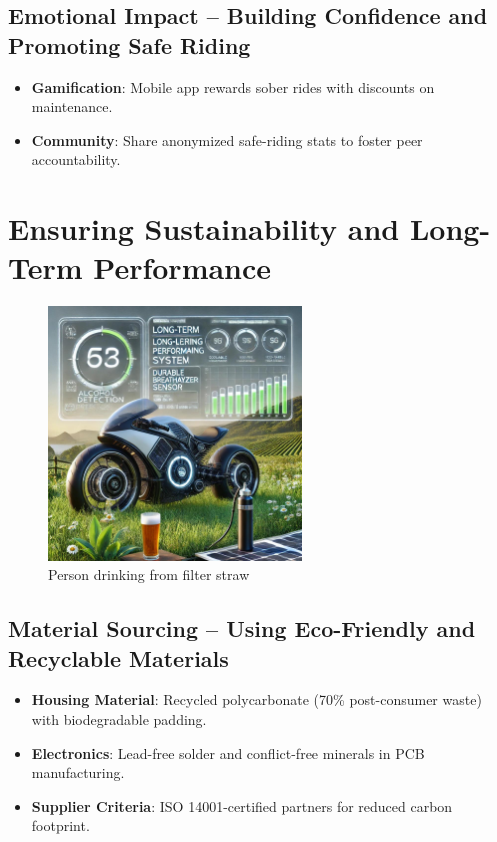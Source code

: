 \documentclass{article}
\begin{document}
\subsection{Emotional Impact -- Building Confidence and Promoting Safe Riding}
\begin{itemize}
    \item \textbf{Gamification}: Mobile app rewards sober rides with discounts on maintenance.
    \item \textbf{Community}: Share anonymized safe-riding stats to foster peer accountability.
\end{itemize}

\newpage

\section{Ensuring Sustainability and Long-Term Performance}
\begin{figure}[h!]
    \centering
    \includegraphics[width=0.6\textwidth]{ac/8.jpg}
    \caption{Person drinking from filter straw}
    \label{fig:Drinking_water}
\end{figure}
\subsection{Material Sourcing -- Using Eco-Friendly and Recyclable Materials}
\begin{itemize}
    \item \textbf{Housing Material}: Recycled polycarbonate (70\% post-consumer waste) with biodegradable padding.
    \item \textbf{Electronics}: Lead-free solder and conflict-free minerals in PCB manufacturing.
    \item \textbf{Supplier Criteria}: ISO 14001-certified partners for reduced carbon footprint.
\end{itemize}
\end{document}
